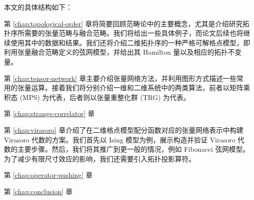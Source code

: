 本文的具体结构如下：

第 \ref{chap:topological-order} 章将简要回顾范畴论中的主要概念，尤其是介绍研究拓扑序所需要的张量范畴与融合范畴。我们将给出一些具体例子，而论文后续也将继续使用其中的数据和结果。我们还将介绍二维拓扑序的一种严格可解格点模型，即利用张量融合范畴定义的弦网模型，并给出其 Hamilton 量以及相应的拓扑不变量。

第 \ref{chap:tensor-network} 章主要介绍张量网络方法，并利用图形方式描述一些常用的张量运算。接着我们将分别介绍一维和二维系统中的两类算法，前者以矩阵乘积态 (MPS) 为代表，后者则以张量重整化群 (TRG) 为代表。

第 \ref{chap:strange-correlator} 章

第 \ref{chap:virasoro} 章介绍了在二维格点模型配分函数对应的张量网络表示中构建 Virasoro 代数的方案。我们首先以 Ising 模型为例，展示构造并验证 Virasoro 代数的主要步骤。然后，我们将其推广到更一般的情况，例如 Fibonacci 弦网模型。为了减少有限尺寸效应的影响，我们还需要引入拓扑投影算符。

第 \ref{chap:operator-pushing} 章

第 \ref{chap:conclusion} 章
